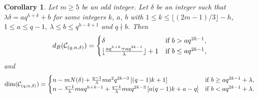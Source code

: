 \documentclass[journal,onecolumn]{IEEEtran}
\newtheorem{Corollary}{Corollary}
\begin{document}
\begin{Corollary}\label{example1}
   Let $m\geq 5$ be an odd integer. Let $\delta$ be an integer such that   $\lambda\delta=a q^{h+k}+b$ for some  integers $k$, $a$, $b$ with 
$1 \le k \le \lfloor (2m-1)/3 \rfloor - h$, 
$1 \le a \le q-1$, 
$\lambda \le b \le q^{h-k+1}$ and $q \nmid b$.
 Then 
  \begin{equation}\label{cor51}
    d_B(\mathcal{C}_{(q,n,\delta)})=
    \begin{cases}
     \delta& \hbox{if }  b> a q^{2k-1},\\
 \lfloor \frac{aq^{h+k}+aq^{2k-1}}{\lambda}\rfloor+1 
 &\hbox{if }   b\leq a q^{2k-1},
    \end{cases}
    \end{equation}
  and 
 \begin{equation}\label{cor52}
    \mathrm{dim}(\mathcal{C}_{(q,n,\delta)})=
    \begin{cases}
      n-mN(\delta)+  \frac{q-1}{\lambda}ma^2q^{2k-3}\left[(q-1)k+1\right]& \hbox{if }  b\geq  a q^{2k-1}+\lambda,\\
 n-\frac{q-1}{\lambda}m a q^{h+k-1}+ \frac{q-1}{\lambda}ma  q^{2k-3}\left[ a(q-1)k+a-q 
 \right]
 &\hbox{if }   b< a q^{2k-1}+\lambda.
    \end{cases}
    \end{equation}   
\end{Corollary}
\end{document}
